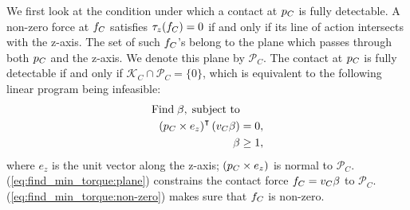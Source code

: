 We first look at the condition under which a contact at ${p}_C$ is fully detectable. A non-zero force at ${f}_C$ satisfies $\tau_z({f}_C) = 0$ if and only if its line of action intersects with the z-axis. The set of such ${f}_C$'s belong to the plane which passes through both ${p}_C$ and the z-axis. We denote this plane by $\mathcal{P}_C$. The contact at ${p}_C$ is fully detectable if and only if $\mathcal{K}_C \cap \mathcal{P}_C = \{{0}\}$, which is equivalent to the following linear program being infeasible:
\begin{subequations}
\label{eq:find_min_torque}
\begin{align}
\text{Find} \; {\beta}, \; \text{subject to} &  \\
\left({p}_C \times {e}_z\right)^\intercal \left({v}_C {\beta} \right) &= 0, \label{eq:find_min_torque:plane}\\
{\beta} &\geq 1, \label{eq:find_min_torque:non-zero}
\end{align}
\end{subequations}
where ${e}_z$ is the unit vector along the z-axis; $({p}_C \times {e}_z)$ is normal to $\mathcal{P}_C$. (\ref{eq:find_min_torque:plane}) constrains the contact force ${f}_C = {v}_C {\beta}$ to $\mathcal{P}_C$. (\ref{eq:find_min_torque:non-zero}) makes sure that ${f}_C$ is non-zero. 


